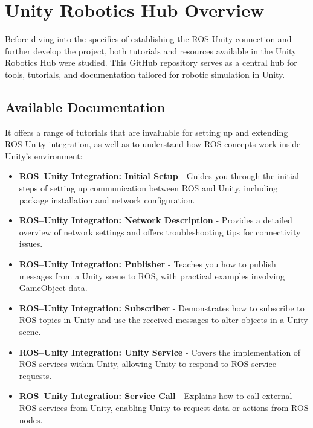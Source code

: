\section{Unity Robotics Hub Overview}

    Before diving into the specifics of establishing the ROS-Unity connection and further develop the project, both tutorials and resources available 
    in the Unity Robotics Hub were studied. This GitHub repository serves as a central hub for tools, tutorials, and documentation tailored for robotic 
    simulation in Unity.

    \subsection{Available Documentation}

    It offers a range of tutorials that are invaluable for setting up and extending ROS-Unity integration, as well as to understand how ROS concepts work inside Unity's environment:
    
    \begin{itemize}
        \item \textbf{ROS–Unity Integration: Initial Setup} - Guides you through the initial steps of setting up communication between ROS and Unity, including package installation and network configuration.
        
        \item \textbf{ROS–Unity Integration: Network Description} - Provides a detailed overview of network settings and offers troubleshooting tips for connectivity issues.
        
        \item \textbf{ROS–Unity Integration: Publisher} - Teaches you how to publish messages from a Unity scene to ROS, with practical examples involving GameObject data.
        
        \item \textbf{ROS–Unity Integration: Subscriber} - Demonstrates how to subscribe to ROS topics in Unity and use the received messages to alter objects in a Unity scene.
        
        \item \textbf{ROS–Unity Integration: Unity Service} - Covers the implementation of ROS services within Unity, allowing Unity to respond to ROS service requests.
        
        \item \textbf{ROS–Unity Integration: Service Call} - Explains how to call external ROS services from Unity, enabling Unity to request data or actions from ROS nodes.
    \end{itemize}
    
